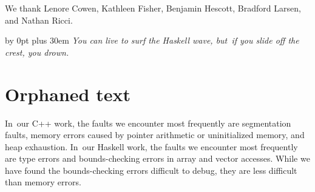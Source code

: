 \documentclass[preprint,nonatbib,blockstyle,nocopyrightspace,times]{sigplanconf}
\begin{document}
%  

 

\ifnotcutting
\acks

We thank Lenore Cowen, Kathleen Fisher, Benjamin Hescott, Bradford
Larsen, and Nathan Ricci. 
\fi









\vfill

\begingroup
\parfillskip=0pt
\advance\leftskip by 0pt plus 30em
\emph{You can live to surf the Haskell wave, but~if you slide off the crest, you
drown.}
\par
\endgroup


\break


\appendix


\section{Orphaned text}


In~our C++ work, the faults we encounter most frequently are
segmentation faults, 
memory errors caused by pointer arithmetic or uninitialized 
memory,
and heap exhaustion.
In~our Haskell work, the faults we encounter most frequently are
type errors and bounds-checking errors in array and vector accesses.
While we have found the bounds-checking errors difficult to debug,
they are less difficult than memory errors.
\end{document}
